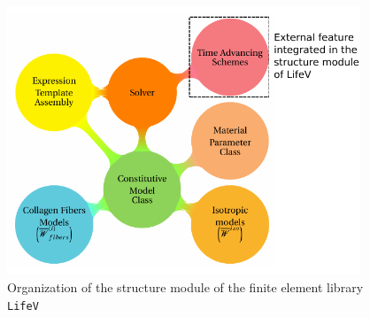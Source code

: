 \documentclass[a4paper, 10pt,twoside]{article}
\theoremstyle{plain}
\theoremstyle{definition}
\theoremstyle{remark}
\begin{document}
\begin{figure}[t!]
  \centering
  \includegraphics[height=8cm]{schemePdf.pdf}
  \caption{Organization of the structure module of the finite element library \texttt{LifeV}}
  \label{organization}
\end{figure}
\end{document}

